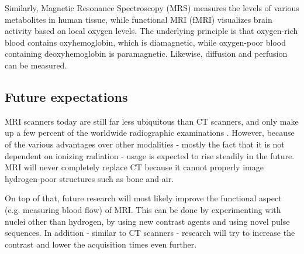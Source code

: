
Similarly, Magnetic Resonance Spectroscopy (MRS) measures the levels of various
metabolites in human tissue, while functional MRI (fMRI) visualizes brain
activity based on local oxygen levels. The underlying principle is that
oxygen-rich blood contains oxyhemoglobin, which is diamagnetic, while
oxygen-poor blood containing deoxyhemoglobin is paramagnetic. Likewise,
diffusion and perfusion can be measured.

\subsection{Future expectations}\label{ssec:mrifuture}
MRI scanners today are still far less ubiquitous than CT scanners, and only make
up a few percent of the worldwide radiographic examinations \cite{oecdhealth}.
However, because of the various advantages over other modalities - mostly the
fact that it is not dependent on ionizing radiation - usage is expected to
rise steadily in the future. MRI will never completely replace CT because it cannot properly
image hydrogen-poor structures such as bone and air.

On top of that, future research will most likely improve the functional aspect
(e.g. measuring blood flow) of MRI. This can be done by experimenting with
nuclei other than hydrogen, by using new contrast agents and using novel pulse
sequences. In addition - similar to CT scanners - research will try to increase
the contrast and lower the acquisition times even further.